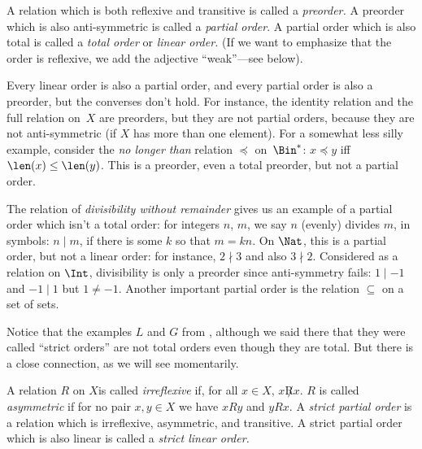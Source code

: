 \documentclass[../../include/open-logic-section]{subfiles}
\begin{document}

\begin{defn}
A relation which is both reflexive and transitive is called a
\emph{preorder.}  A preorder which is also anti-symmetric is called a
\emph{partial order}. A partial order which is also total is called a
\emph{total order} or \emph{linear order.} (If we want to emphasize
that the order is reflexive, we add the adjective ``weak''---see
below).
\end{defn}

\begin{ex}
Every linear order is also a partial order, and every partial order is
also a preorder, but the converses don't hold. For instance, the
identity relation and the full relation on~$X$ are preorders, but they
are not partial orders, because they are not anti-symmetric (if $X$
has more than one element). For a somewhat less silly example,
consider the \emph{no longer than} relation $\preccurlyeq$
on~$\Bin^*$: $x \preccurlyeq y$ iff $\len(x) \le \len(y)$. This is a
preorder, even a total preorder, but not a partial order.

The relation of \emph{divisibility without remainder} gives us an
example of a partial order which isn't a total order: for integers
$n$, $m$, we say $n$ (evenly) divides $m$, in symbols: $n\mid m$, if
there is some $k$ so that $m=kn$.  On $\Nat$, this is a partial order,
but not a linear order: for instance, $2\nmid3$ and also
$3\nmid2$. Considered as a relation on $\Int$, divisibility is only a
preorder since anti-symmetry fails: $1\mid-1$ and $-1\mid1$ but
$1\neq-1$. Another important partial order is the relation $\subseteq$
on a set of sets.

Notice that the examples $L$ and $G$ from ,
although we said there that they were called ``strict orders'' are not
total orders even though they are total. But there is a close
connection, as we will see momentarily.
\end{ex}

\begin{defn}
A relation $R$ on $X$is called \emph{irreflexive} if, for all $x\in
X$, $x\not Rx$. $R$ is called \emph{asymmetric} if for no pair $x,y\in
X$ we have $xRy$ and $yRx$. A \emph{strict partial order} is a
relation which is irreflexive, asymmetric, and transitive. A strict
partial order which is also linear is called a \emph{strict linear
  order.}
\end{defn}
\end{document}
